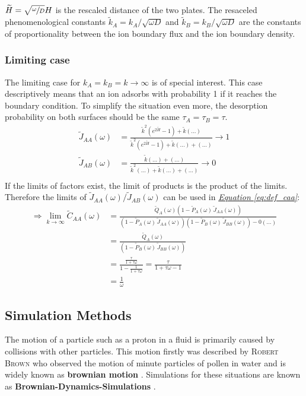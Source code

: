 \documentclass[a4paper, parskip=half]{scrartcl}
\newcommand{\person}[1]{%
	\textsc{#1}%
}
\newcommand{\effect}[1]{%
	\textbf{#1}%
}
\newcommand{\myEqRef}[1]{\textit{\hyperref[eq:#1]{Equation \ref*{eq:#1}}}}
\newcommand{\myEqLabel}[1]{\label{eq:#1}}
\begin{document}
$\widetilde{H} = \sqrt{\sfrac{\omega}{D}} H$ is the rescaled distance of the two plates. The resaceled phenomenological constants $\widetilde{k}_A = k_A / \sqrt{\omega D}$ and $\widetilde{k}_B = k_B / \sqrt{\omega D}$ are the constants of proportionality between the ion boundary flux and the ion boundary density.
\subsubsection{Limiting case}
The limiting case for $k_A = k_B = k \rightarrow \infty$ is of special interest. This case descriptively means that an ion adsorbs with probability 1 if it reaches the boundary condition. To simplify the situation even more, the desorption probability on both surfaces should be the same $\tau_A = \tau_B = \tau$.
\begin{align}
\widetilde{J}_{AA}(\omega) &= \frac{\widetilde{k}^2 \left(e^{2\widetilde{H}} - 1\right) + \widetilde{k}(...)}{\widetilde{k}^2 \left(e^{2\widetilde{H}} - 1\right) + \widetilde{k}(...) + (...)} \rightarrow 1\\
\widetilde{J}_{AB}(\omega) &= \frac{\widetilde{k}(...) + (...)}{\widetilde{k}^2(...) + \widetilde{k}(...) + (...)} \rightarrow 0\\
\end{align}
If the limits of factors exist, the limit of products is the product of the limits. Therefore the limits of $\widetilde{J}_{AA}(\omega)/\widetilde{J}_{AB}(\omega)$ can be used in \myEqRef{def_caa}:
\begin{align}
\Rightarrow \lim_{k\rightarrow\infty} \widetilde{C}_{AA}(\omega) &= \frac{\widetilde{Q}_A(\omega)\left(1 - \widetilde{P}_A(\omega)\, \widetilde{J}_{AA}(\omega) \right)}{\left(1 - \widetilde{P}_A(\omega)\, \widetilde{J}_{AA}(\omega) \right)\left(1 - \widetilde{P}_B(\omega)\, \widetilde{J}_{BB}(\omega) \right) - 0(...)}\\
&= \frac{\widetilde{Q}_A(\omega)}{\left(1 - \widetilde{P}_B(\omega)\, \widetilde{J}_{BB}(\omega) \right)}\\
&= \frac{\frac{\tau}{1+\tau\omega}}{1-\frac{1}{1+\tau\omega}} = \frac{\tau}{1+\tau\omega - 1}\\
&= \frac{1}{\omega} \myEqLabel{analytic_caa}
\end{align}
\newpage
\subsection{Simulation Methods}
The motion of a particle such as a proton in a fluid is primarily  caused by collisions with other particles. This motion firstly was described by \person{Robert Brown} who observed the motion of minute particles of pollen in water and is widely known as \effect{brownian motion}. Simulations for these situations are known as \effect{Brownian-Dynamics-Simulations}.
\end{document}
